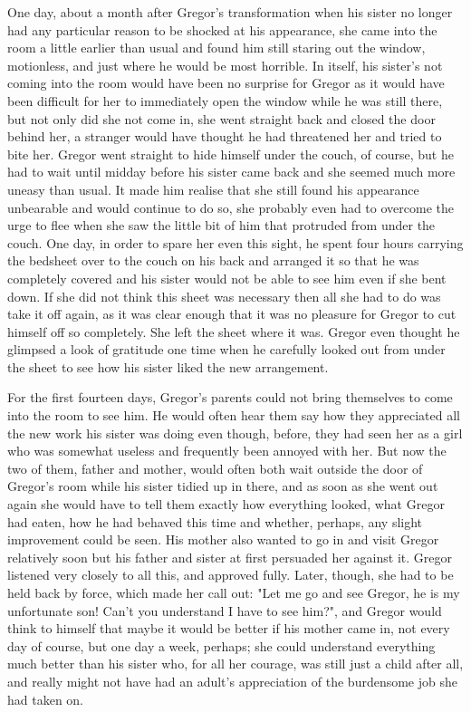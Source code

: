 \documentclass[12pt]{book}
\begin{document}
    One day, about a month after Gregor's transformation when his sister no longer had any particular reason to be shocked at his appearance, she came into the room a little earlier than usual and found him still staring out the window, motionless, and just where he would be most horrible. In itself, his sister's not coming into the room would have been no surprise for Gregor as it would have been difficult for her to immediately open the window while he was still there, but not only did she not come in, she went straight back and closed the door behind her, a stranger would have thought he had threatened her and tried to bite her. Gregor went straight to hide himself under the couch, of course, but he had to wait until midday before his sister came back and she seemed much more uneasy than usual. It made him realise that she still found his appearance unbearable and would continue to do so, she probably even had to overcome the urge to flee when she saw the little bit of him that protruded from under the couch. One day, in order to spare her even this sight, he spent four hours carrying the bedsheet over to the couch on his back and arranged it so that he was completely covered and his sister would not be able to see him even if she bent down. If she did not think this sheet was necessary then all she had to do was take it off again, as it was clear enough that it was no pleasure for Gregor to cut himself off so completely. She left the sheet where it was. Gregor even thought he glimpsed a look of gratitude one time when he carefully looked out from under the sheet to see how his sister liked the new arrangement.

    For the first fourteen days, Gregor's parents could not bring themselves to come into the room to see him. He would often hear them say how they appreciated all the new work his sister was doing even though, before, they had seen her as a girl who was somewhat useless and frequently been annoyed with her. But now the two of them, father and mother, would often both wait outside the door of Gregor's room while his sister tidied up in there, and as soon as she went out again she would have to tell them exactly how everything looked, what Gregor had eaten, how he had behaved this time and whether, perhaps, any slight improvement could be seen. His mother also wanted to go in and visit Gregor relatively soon but his father and sister at first persuaded her against it. Gregor listened very closely to all this, and approved fully. Later, though, she had to be held back by force, which made her call out: "Let me go and see Gregor, he is my unfortunate son! Can't you understand I have to see him?", and Gregor would think to himself that maybe it would be better if his mother came in, not every day of course, but one day a week, perhaps; she could understand everything much better than his sister who, for all her courage, was still just a child after all, and really might not have had an adult's appreciation of the burdensome job she had taken on.
\end{document}
